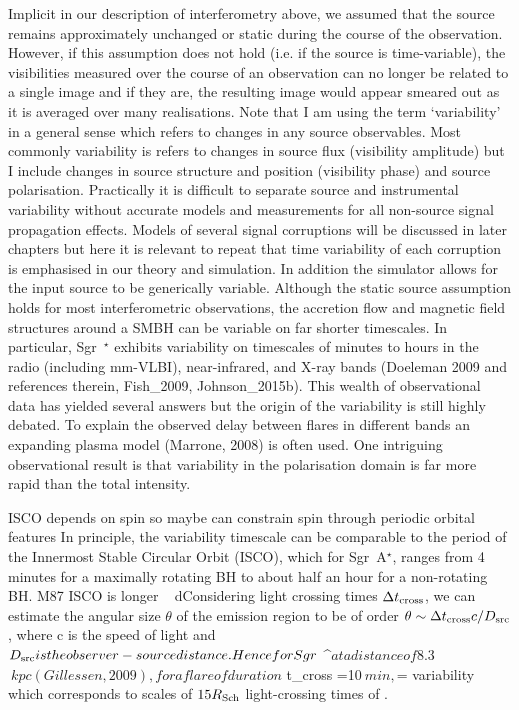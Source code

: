 Implicit in our description of interferometry above, we assumed that the source remains approximately unchanged or static during the course of the observation. However, if this assumption does not hold (i.e. if the source is time-variable),  the visibilities measured over the course of an observation can no longer be related to a single image and if they are, the resulting image would appear smeared out as it is averaged over many realisations. 
Note that I am using the term `variability' in a general sense which refers to changes in any source observables. Most commonly variability is refers to changes in source flux (visibility amplitude) but I include changes in source structure and position (visibility phase) and source polarisation. Practically it is difficult to separate source and instrumental variability without accurate models and measurements for all non-source signal propagation effects. Models of several signal corruptions will be discussed in later chapters but here it is relevant to repeat that time variability of each corruption is emphasised in our theory and simulation. In addition the simulator allows for the input source to be generically variable. 
Although the static source assumption holds for most interferometric observations, the accretion flow and magnetic field structures around a SMBH can be variable on far shorter timescales.  In particular, Sgr~$^\star$ exhibits variability on timescales of minutes to hours in the radio (including mm-VLBI), near-infrared, and X-ray bands (Doeleman 2009 and references therein, Fish_2009, Johnson_2015b). This wealth of observational data has yielded several answers but the origin of the variability is still highly debated. To explain the observed delay between flares in different bands an expanding plasma model (Marrone, 2008) is often used. One intriguing observational result is that variability in the polarisation domain is far more rapid than the total intensity. 

ISCO depends on spin so maybe can constrain spin through periodic orbital features
In principle, the variability timescale can be comparable to the period of the Innermost Stable Circular Orbit (ISCO), which for Sgr~A$^\star$, ranges from 4 minutes for a maximally rotating BH to about half an hour for a non-rotating BH. M87 ISCO is longer ~ dConsidering light crossing times $\Delta t_{\rm cross}$, we can estimate the angular size $\theta$ of the emission region to be of order $\theta \sim \Delta t_{\rm cross} c /D_{\rm src}$, where c is the speed of light and $D_{\rm src} is the observer-source distance. Hence for Sgr~$^\star$ at a distance of $8.3$~kpc (Gillessen, 2009), for a flare of duration $ \Delta t_{\rm cross} =10$~min, $\theta =  variability   which corresponds to scales of  $15 R_{\rm Sch}$  light-crossing times of . 


